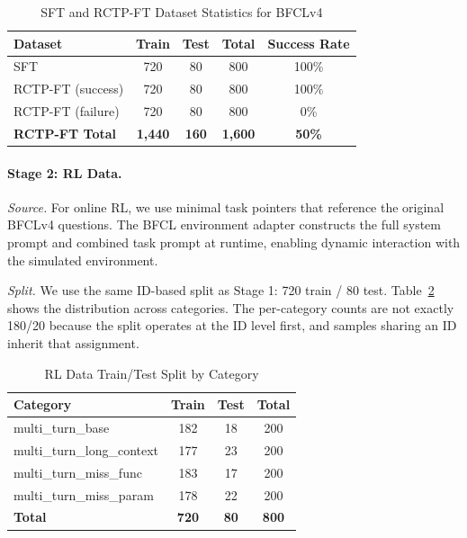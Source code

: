 \documentclass{article}
\theoremstyle{plain}
\theoremstyle{definition}
\theoremstyle{remark}
\begin{document}
\begin{table}[h]
\centering
\caption{SFT and RCTP-FT Dataset Statistics for BFCLv4}
\label{tab:bfcl_stats}
\small
\begin{tabular}{@{}lcccc@{}}
\toprule
\textbf{Dataset} & \textbf{Train} & \textbf{Test} & \textbf{Total} & \textbf{Success Rate} \\
\midrule
SFT & 720 & 80 & 800 & 100\% \\
\midrule
RCTP-FT (success) & 720 & 80 & 800 & 100\% \\
RCTP-FT (failure) & 720 & 80 & 800 & 0\% \\
\textbf{RCTP-FT Total} & \textbf{1,440} & \textbf{160} & \textbf{1,600} & \textbf{50\%} \\
\bottomrule
\end{tabular}
\end{table}

\paragraph{Stage 2: RL Data.}

\textit{Source.} For online RL, we use minimal task pointers that reference the original BFCLv4 questions. The BFCL environment adapter constructs the full system prompt and combined task prompt at runtime, enabling dynamic interaction with the simulated environment.

\textit{Split.} We use the same ID-based split as Stage 1: 720 train / 80 test. Table~\ref{tab:rl_split} shows the distribution across categories. The per-category counts are not exactly 180/20 because the split operates at the ID level first, and samples sharing an ID inherit that assignment.

\begin{table}[h]
\centering
\caption{RL Data Train/Test Split by Category}
\label{tab:rl_split}
\small
\begin{tabular}{@{}lccc@{}}
\toprule
\textbf{Category} & \textbf{Train} & \textbf{Test} & \textbf{Total} \\
\midrule
multi\_turn\_base & 182 & 18 & 200 \\
multi\_turn\_long\_context & 177 & 23 & 200 \\
multi\_turn\_miss\_func & 183 & 17 & 200 \\
multi\_turn\_miss\_param & 178 & 22 & 200 \\
\midrule
\textbf{Total} & \textbf{720} & \textbf{80} & \textbf{800} \\
\bottomrule
\end{tabular}
\end{table}
\end{document}
